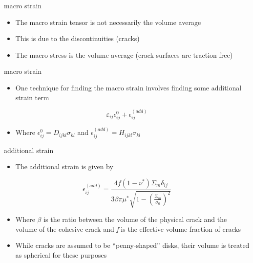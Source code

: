 \documentclass[
  letterpaper,
  ignorenonframetext,
  aspectratio=43,
  handout,
  12pt]{beamer}
\providecommand{\tightlist}{%
  \setlength{\itemsep}{0pt}\setlength{\parskip}{0pt}}
\providecommand{\tightlist}{%
\setlength{\itemsep}{0pt}\setlength{\parskip}{0pt}}
\begin{document}
\begin{frame}{macro strain}
\protect\hypertarget{macro-strain}{}
\begin{itemize}
\tightlist
\item
  The macro strain tensor is not necessarily the volume average
\item
  This is due to the discontinuities (cracks)
\item
  The macro stress is the volume average (crack surfaces are traction
  free)
\end{itemize}
\end{frame}

\begin{frame}{macro strain}
\protect\hypertarget{macro-strain-1}{}
\begin{itemize}
\tightlist
\item
  One technique for finding the macro strain involves finding some
  additional strain term
\end{itemize}

\[ \varepsilon_{ij} \epsilon_{ij}^0 + \epsilon_{ij}^(add)\]

\begin{itemize}
\tightlist
\item
  Where \(\epsilon_{ij}^0 = D_{ijkl} \sigma_{kl}\) and
  \(\epsilon_{ij}^{(add)} = H_{ijkl} \sigma_{kl}\)
\end{itemize}
\end{frame}

\begin{frame}{additional strain}
\protect\hypertarget{additional-strain}{}
\begin{itemize}
\tightlist
\item
  The additional strain is given by
\end{itemize}

\[\epsilon_{ij}^{(add)} = \frac{4f(1-\nu^*)\Sigma_m\delta_{ij}}{3\beta \pi \mu^* \sqrt{1-\left(\frac{\Sigma_m}{\sigma_0}\right)^2}}\]

\begin{itemize}
\tightlist
\item
  Where \(\beta\) is the ratio between the volume of the physical crack
  and the volume of the cohesive crack and \emph{f} is the effective
  volume fraction of cracks
\item
  While cracks are assumed to be ``penny-shaped'' disks, their volume is
  treated as spherical for these purposes
\end{itemize}
\end{frame}
\end{document}
